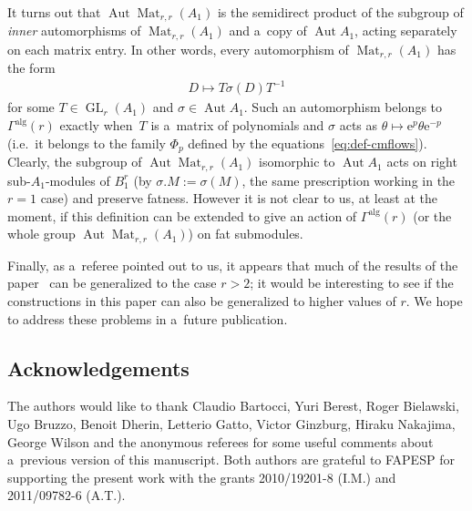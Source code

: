 \documentclass[pdftex]{sigma}
\DeclareMathOperator{\GL}{GL}
\DeclareMathOperator{\Mat}{Mat}
\DeclareMathOperator{\Aut}{Aut}
\begin{document}
It turns out that \(\Aut \Mat_{r,r}(A_{1})\) is the semidirect product of the subgroup of \emph{inner}
automorphisms of \(\Mat_{r,r}(A_{1})\) and a~copy of \(\Aut A_{1}\), acting separately on each matrix entry.
In other words, every automorphism of \(\Mat_{r,r}(A_{1})\) has the form
\begin{gather*}%
D\mapsto T\sigma(D)T^{-1}
\end{gather*}
for some \(T\in \GL_{r}(A_{1})\) and \(\sigma \in \Aut A_{1}\).
Such an automorphism belongs to \(\Gamma^{\mathrm{alg}}(r)\) exactly when~\(T\) is a~matrix of polynomials
and \(\sigma\) acts as \(\theta\mapsto \mathrm{e}^{p}\theta \mathrm{e}^{-p}\) (i.e.\
it belongs to the family \(\Phi_{p}\) def\/ined by the equations~\eqref{eq:def-cmflows}).
Clearly, the subgroup of \(\Aut \Mat_{r,r}(A_{1})\) isomorphic to \(\Aut A_{1}\) acts on right
sub-\(A_{1}\)-modules of \(B_{1}^{r}\) (by \(\sigma.M\mathrel{:=} \sigma(M)\), the same prescription
working in the \(r=1\) case) and preserve fatness.
However it is not clear to us, at least at the moment, if this def\/inition can be extended to give an
action of \(\Gamma^{\mathrm{alg}}(r)\) (or the whole group \(\Aut \Mat_{r,r}(A_{1})\)) on fat submodules.

Finally, as a~referee pointed out to us, it appears that much of the results of the paper~\cite{bp08} can
be generalized to the case \(r>2\); it would be interesting to see if the constructions in this paper can
also be generalized to higher values of \(r\).
We hope to address these problems in a~future publication.

\subsection*{Acknowledgements}

The authors would like to thank Claudio Bartocci, Yuri Berest, Roger Bielawski, Ugo Bruzzo, Benoit Dherin,
Letterio Gatto, Victor Ginzburg, Hiraku Nakajima, George Wilson and the anonymous referees for some useful
comments about a~previous version of this manuscript.
Both authors are grateful to FAPESP for supporting the present work with the grants 2010/19201-8 (I.M.) and
2011/09782-6 (A.T.).
\end{document}
